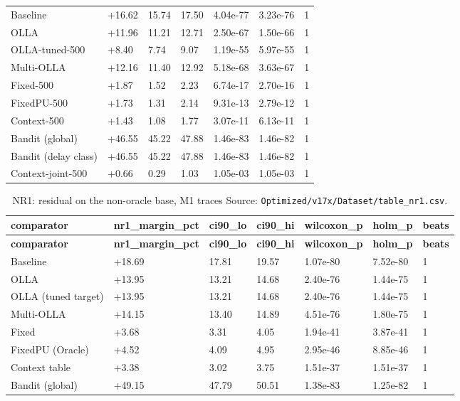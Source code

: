 \documentclass[10pt]{article}
\begin{document}
\begin{landscape}
\begin{longtable}{@{}lllllll@{}}
\midrule
\endhead
Baseline & +16.62 & 15.74 & 17.50 & 4.04e-77 & 3.23e-76 & 1 \\
OLLA & +11.96 & 11.21 & 12.71 & 2.50e-67 & 1.50e-66 & 1 \\
OLLA-tuned-500 & +8.40 & 7.74 & 9.07 & 1.19e-55 & 5.97e-55 & 1 \\
Multi-OLLA & +12.16 & 11.40 & 12.92 & 5.18e-68 & 3.63e-67 & 1 \\
Fixed-500 & +1.87 & 1.52 & 2.23 & 6.74e-17 & 2.70e-16 & 1 \\
FixedPU-500 & +1.73 & 1.31 & 2.14 & 9.31e-13 & 2.79e-12 & 1 \\
Context-500 & +1.43 & 1.08 & 1.77 & 3.07e-11 & 6.13e-11 & 1 \\
Bandit (global) & +46.55 & 45.22 & 47.88 & 1.46e-83 & 1.46e-82 & 1 \\
Bandit (delay class) & +46.55 & 45.22 & 47.88 & 1.46e-83 & 1.46e-82 & 1 \\
Context-joint-500 & +0.66 & 0.29 & 1.03 & 1.05e-03 & 1.05e-03 & 1 \\
\bottomrule
\end{longtable}
\normalsize
\tiny
\setlength{\tabcolsep}{2pt}
\begin{longtable}{@{}lllllll@{}}
\caption{NR1: residual on the non-oracle base, M1 traces Source: \texttt{Optimized/v17x/Dataset/table\_nr1.csv}.}\\
\toprule
\textbf{comparator} & \textbf{nr1\_margin\_pct} & \textbf{ci90\_lo} & \textbf{ci90\_hi} & \textbf{wilcoxon\_p} & \textbf{holm\_p} & \textbf{beats} \\
\midrule
\endfirsthead
\toprule
\textbf{comparator} & \textbf{nr1\_margin\_pct} & \textbf{ci90\_lo} & \textbf{ci90\_hi} & \textbf{wilcoxon\_p} & \textbf{holm\_p} & \textbf{beats} \\
\midrule
\endhead
Baseline & +18.69 & 17.81 & 19.57 & 1.07e-80 & 7.52e-80 & 1 \\
OLLA & +13.95 & 13.21 & 14.68 & 2.40e-76 & 1.44e-75 & 1 \\
OLLA (tuned target) & +13.95 & 13.21 & 14.68 & 2.40e-76 & 1.44e-75 & 1 \\
Multi-OLLA & +14.15 & 13.40 & 14.89 & 4.51e-76 & 1.80e-75 & 1 \\
Fixed & +3.68 & 3.31 & 4.05 & 1.94e-41 & 3.87e-41 & 1 \\
FixedPU (Oracle) & +4.52 & 4.09 & 4.95 & 2.95e-46 & 8.85e-46 & 1 \\
Context table & +3.38 & 3.02 & 3.75 & 1.51e-37 & 1.51e-37 & 1 \\
Bandit (global) & +49.15 & 47.79 & 50.51 & 1.38e-83 & 1.25e-82 & 1 \\

\end{longtable}
\end{landscape}
\end{document}
